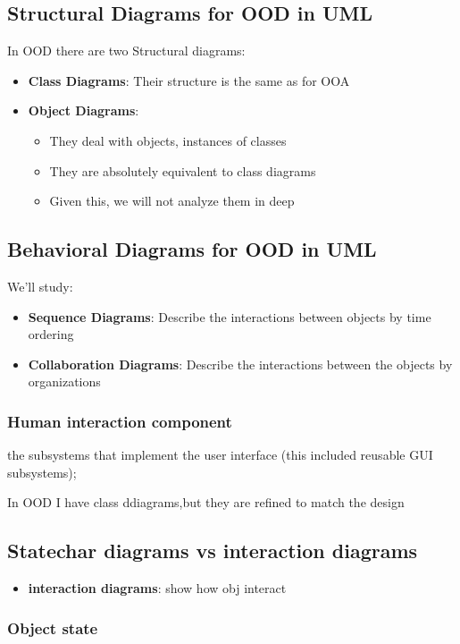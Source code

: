 \subsection{Structural Diagrams for OOD in UML}
In OOD there are two Structural diagrams:
\begin{itemize}
    \item \textbf{Class Diagrams}: Their structure is the same as for OOA
    \item \textbf{Object Diagrams}:
    \begin{itemize}
        \item They deal with objects, instances of classes
        \item  They are absolutely equivalent to class diagrams
        \item  Given this, we will not analyze them in deep
    \end{itemize} 
\end{itemize}

\subsection{Behavioral Diagrams for OOD in UML}
We'll study:
\begin{itemize}
    \item \textbf{Sequence Diagrams}: Describe the interactions between objects by time ordering
    \item \textbf{Collaboration Diagrams}: Describe the interactions between the objects by organizations
\end{itemize}


\subsubsection{Human interaction component}
the subsystems that implement the user interface (this included reusable GUI subsystems);

In OOD I have class ddiagrams,but they are refined to match the design

\subsection{Statechar diagrams vs interaction diagrams}
\begin{itemize}
    \item \textbf{interaction diagrams}: show how obj interact
\end{itemize}

\subsubsection{Object state}

